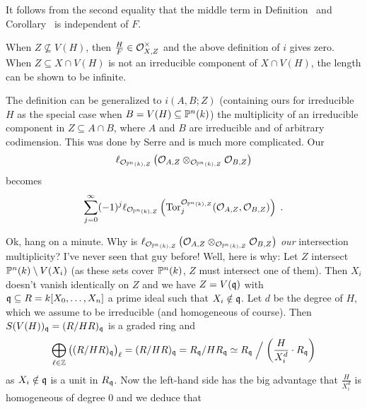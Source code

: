 \documentclass[a4paper,parskip=half,numbers=enddot, DIV=12]{scrreprt}
\begin{document}
\begin{rem}
    \begin{alphanumerate}
    \item {}
        It follows from the second equality that the middle term in Definition~ and Corollary~ is independent of $F$.
    \item 
        When $Z\not\subseteq V(H)$, then $\frac{H}{F}\in \mathcal{O}_{X,Z}^\times$ and the above definition of $i$ gives zero. When $Z\subseteq X\cap V(H)$ is not an irreducible component of $X\cap V(H)$, the length can be shown to be infinite.
    \item 
        The definition can be generalized to $i(A,B;Z)$ (containing ours for irreducible $H$ as the special case when $B=V(H)\subseteq \mathbb{P}^n(k)$) the multiplicity of an irreducible component in $Z\subseteq A\cap B$, where $A$ and $B$ are irreducible and of arbitrary codimension. This was done by Serre and is much more complicated. Our
        \begin{align*}
            \ell_{\mathcal{O}_{\mathbb{P}^n(k), Z}}\left(\mathcal{O}_{A,Z}\otimes_{\mathcal{O}_{\mathbb{P}^n(k), Z}} \mathcal{O}_{B,Z} \right)
        \end{align*}
        becomes
        \begin{align*}
            \sum_{j=0}^\infty (-1)^j \ell_{\mathcal{O}_{\mathbb{P}^n(k), Z}}\left(\operatorname{Tor}_j^{\mathcal{O}_{\mathbb{P}^n(k), Z}}(\mathcal{O}_{A,Z},\mathcal{O}_{B,Z})\right)\;.
        \end{align*}
        \item Ok, hang on a minute. Why is $\ell_{\mathcal{O}_{\mathbb{P}^n(k), Z}}\left(\mathcal{O}_{A,Z}\otimes_{\mathcal{O}_{\mathbb{P}^n(k), Z}} \mathcal{O}_{B,Z} \right)$ \emph{our} intersection multiplicity? I've never seen that guy before! Well, here is why: Let $Z$ intersect $\mathbb{P}^n(k)\setminus V(X_i)$ (as these sets cover $\mathbb{P}^n(k)$, $Z$ must intersect one of them). Then $X_i$ doesn't vanish identically on $Z$ and we have $Z=V(\mathfrak{q})$ with $\mathfrak{q}\subseteq R=k[X_0,\ldots,X_n]$ a prime ideal such that $X_i\notin\mathfrak{q}$. Let $d$ be the degree of $H$, which we assume to be irreducible (and homogeneous of course). Then $S(V(H))_{\mathfrak{q}}=(R/HR)_{\mathfrak{q}}$ is a graded ring and
        \begin{align*}
        	\bigoplus_{\ell\in\mathbb{Z}}\big((R/HR)_{\mathfrak{q}}\big)_\ell=(R/HR)_{\mathfrak{q}}=R_{\mathfrak{q}}/H R_{\mathfrak{q}}\simeq R_{\mathfrak{q}}\Bigm/\left(\frac{H}{X_i^d}\cdot R_{\mathfrak{q}}\right)
        \end{align*}
        as $X_i\notin\mathfrak{q}$ is a unit in $R_{\mathfrak{q}}$. Now the left-hand side has the big advantage that $\frac{H}{X_i^d}$ is homogeneous of degree $0$ and we deduce that 

\end{alphanumerate}
\end{rem}
\end{document}
